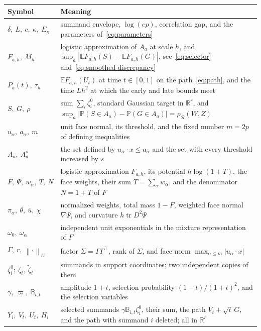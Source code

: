 \documentclass[11pt,letterpaper]{article}
\theoremstyle{remark}
\newcommand{\E}{\mathbb E}
\newcommand{\Pp}{\mathbb P}
\newcommand{\R}{\mathbb R}
\newcommand{\tr}{\operatorname{tr}}
\newcommand{\norm}[1]{\left\lVert#1\right\rVert}
\newcommand{\rh}{\rho_{\mathcal R}}
\begin{document}
\medskip
\begingroup
\small
\renewcommand{\arraystretch}{1.15}
\begin{longtable}{@{}p{}p{}@{}}
\textbf{Symbol} & \textbf{Meaning}\\
\endhead
\(\delta,\ L,\ c,\ \kappa,\ E_\kappa\) & summand envelope,
\(\log(ep)\), correlation gap, and the parameters
of~\eqref{eq:parameters}\\
\(F_{a,h},\ M_h\) & logistic approximation of \(A_a\) at scale
\(h\), and \(\sup_a|\E F_{a,h}(S)-\E F_{a,h}(G)|\),
see~\eqref{eq:selector} and~\eqref{eq:smoothed-discrepancy}\\
\(P_a(t),\ \tau_h\) & \(\E F_{a,h}(U_t)\) at time \(t\in[0,1]\) on
the path~\eqref{eq:path}, and the time \(Lh^2\) at which the early and
late bounds meet\\
\(S,\ G,\ \rho\) & sum \(\sum_i\zeta_i^0\), standard Gaussian target
in \(\R^r\), and \(\sup_a|\Pp(S\in A_a)-\Pp(G\in A_a)|=\rh(W,Z)\)\\
\(u_\alpha,\ a_\alpha,\ m\) & unit face normal, its threshold, and
the fixed number \(m=2p\) of defining inequalities\\
\(A_a,\ A_a^s\) & the set defined by \(u_\alpha\cdot x\le a_\alpha\)
and the set with every threshold increased by \(s\)\\
\(F,\ \Psi,\ w_\alpha,\ T,\ N\) & logistic approximation \(F_{a,h}\), its potential
\(h\log(1+T)\), the face weights, their sum
\(T=\sum_\alpha w_\alpha\), and the denominator \(N=1+T\) of \(F\)\\
\(\pi_\alpha,\ \theta,\ \bar u,\ \chi\) & normalized weights, total
mass \(1-F\), weighted face normal \(\nabla\Psi\), and curvature
\(h\tr D^2\Psi\)\\
\(\omega_0,\ \omega_\alpha\) & independent unit exponentials in the
mixture representation of \(F\)\\
\(\Gamma,\ r,\ \norm\cdot_U\) & factor \(\Sigma=\Gamma\Gamma^\top\),
rank of \(\Sigma\), and face norm \(\max_{\alpha\le m}|u_\alpha\cdot x|\)\\
\(\zeta_i^0;\ \zeta_i,\ \widetilde\zeta_i\) & summands in support coordinates; two
independent copies of them\\
\(\gamma,\ \varpi,\ \mathbb B_{i,t}\) & amplitude \(1+t\), selection
probability \((1-t)/(1+t)^2\), and the selection variables\\
\(Y_i,\ V_t,\ U_t,\ H_i\) & selected summands
\(\gamma\mathbb B_{i,t}\zeta_i^0\), their sum, the path
\(V_t+\sqrt t\,G\), and the path with summand \(i\) deleted; all in \(\R^r\)\\

\end{longtable}
\end{document}
